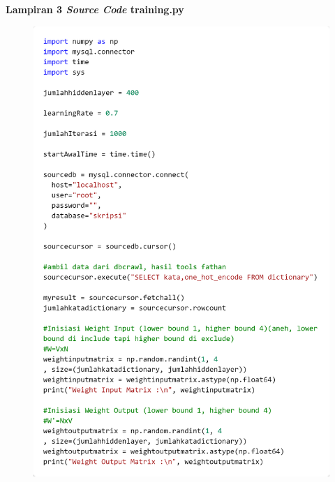 \documentclass[12pt]{report}
\begin{document}
\newpage
{\parindent0pt \textbf{Lampiran 3 \textit{Source Code} training.py}}
\begin{figure}[H]
\centering
\includegraphics[scale=0.3]{training1}
\end{figure}
\end{document}
